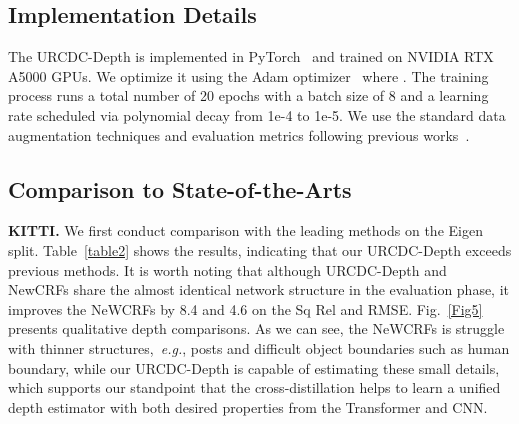 \documentclass[letterpaper]{article} \usepackage{aaai23}  \usepackage{times}  \usepackage{helvet}  \usepackage{courier}  \usepackage[hyphens]{url}  \usepackage{graphicx} \urlstyle{rm} \def\UrlFont{\rm}  \usepackage{natbib}  \usepackage{caption} \frenchspacing  \setlength{\pdfpagewidth}{8.5in} \setlength{\pdfpageheight}{11in} \usepackage{algorithm}
\begin{document}
\subsection{Implementation Details}
The URCDC-Depth is implemented in PyTorch~\cite{paszke2017automatic} and trained on NVIDIA RTX A5000 GPUs. We optimize it using the Adam optimizer~\cite{kingma2015adam} where . The training process runs a total number of 20 epochs with a batch size of 8 and a learning rate scheduled via polynomial decay from 1e-4 to 1e-5. We use the standard data augmentation techniques and evaluation metrics following previous works~\cite{Yuan_2022_CVPR, lee2019big}.



\subsection{Comparison to State-of-the-Arts}
\textbf{KITTI.} We first conduct comparison with the leading methods on the Eigen split. Table~\ref{table2} shows the results, indicating that our URCDC-Depth exceeds previous methods. It is worth noting that although URCDC-Depth and NewCRFs share the almost identical network structure in the evaluation phase, it improves the NeWCRFs by 8.4 and 4.6 on the Sq Rel and RMSE. Fig.~\ref{Fig5} presents qualitative depth comparisons. As we can see, the NeWCRFs is struggle with thinner structures,~\textit{e.g.}, posts and difficult object boundaries such as human boundary, while our URCDC-Depth is capable of estimating these small details, which supports our standpoint that the cross-distillation helps to learn a unified depth estimator with both desired properties from the Transformer and CNN.
\end{document}
